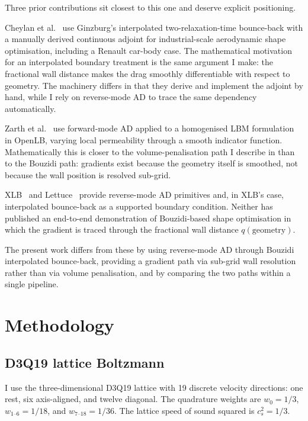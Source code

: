 \documentclass[10pt,twocolumn]{article}
\begin{document}
Three prior contributions sit closest to this one and deserve
explicit positioning.

Cheylan et al.~\cite{cheylan2019} use Ginzburg's interpolated
two-relaxation-time bounce-back with a manually derived continuous
adjoint for industrial-scale aerodynamic shape optimisation,
including a Renault car-body case. The mathematical motivation for
an interpolated boundary treatment is the same argument I make: the
fractional wall distance makes the drag smoothly differentiable
with respect to geometry. The machinery differs in that they
derive and implement the adjoint by hand, while I rely on
reverse-mode AD to trace the same dependency automatically.

Zarth et al.~\cite{zarth2021} use forward-mode AD applied to a
homogenised LBM formulation in OpenLB, varying local permeability
through a smooth indicator function. Mathematically this is closer
to the volume-penalisation path I describe in
 than to the Bouzidi path: gradients exist
because the geometry itself is smoothed, not because the wall
position is resolved sub-grid.

XLB~\cite{ataei2024} and Lettuce~\cite{bedrunka2021} provide
reverse-mode AD primitives and, in XLB's case, interpolated
bounce-back as a supported boundary condition. Neither has
published an end-to-end demonstration of Bouzidi-based shape
optimisation in which the gradient is traced through the
fractional wall distance $q(\text{geometry})$.

The present work differs from these by using reverse-mode AD
through Bouzidi interpolated bounce-back, providing a gradient
path via sub-grid wall resolution rather than via volume
penalisation, and by comparing the two paths within a single
pipeline.


\section{Methodology}
\label{sec:method}

\subsection{D3Q19 lattice Boltzmann}

I use the three-dimensional D3Q19 lattice with 19 discrete velocity
directions: one rest, six axis-aligned, and twelve diagonal. The
quadrature weights are $w_0 = 1/3$, $w_{1\text{--}6} = 1/18$, and
$w_{7\text{--}18} = 1/36$. The lattice speed of sound squared is $c_s^2
= 1/3$.
\end{document}
